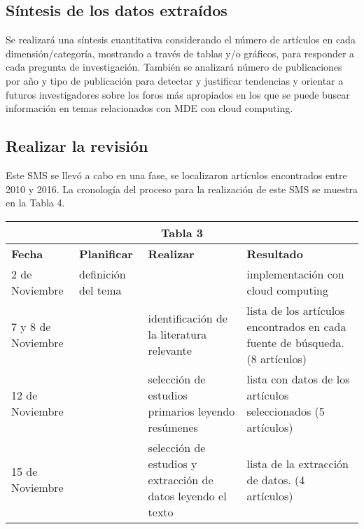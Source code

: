 \documentclass{llncs}
\begin{document}
\subsection{Síntesis de los datos extraídos}

Se realizará una síntesis cuantitativa considerando el número de artículos en cada dimensión/categoría, mostrando a través de tablas y/o gráficos, para responder a cada pregunta de investigación.
También se analizará número de publicaciones por año y tipo de publicación para detectar y justificar tendencias y orientar a futuros investigadores sobre los foros más apropiados en los que se puede buscar información en temas relacionados con MDE con cloud computing.

\subsection{Realizar la revisión}
Este SMS se llevó a cabo en una fase, se localizaron artículos encontrados entre 2010 y 2016. La cronología del proceso para la realización de este SMS se muestra en la Tabla 4. \\
\begin{tabular}{  | p{2cm} | p{3cm}  |  p{3cm} | p{3cm} |}
  \hline
  \multicolumn{4}{|c|}{\bf Tabla 3} \\
  \hline
  \bf Fecha  & \bf Planificar & \bf Realizar & \bf Resultado \\
  \hline
   2 de Noviembre  & definición del tema & & implementación con cloud computing\\
  \hline
   7 y 8 de Noviembre &  & identificación de la literatura relevante & lista de los artículos encontrados en cada fuente de búsqueda.(8 artículos)\\
   \hline
    12 de Noviembre  & & selección de estudios primarios leyendo resúmenes & lista con datos de los artículos seleccionados (5 artículos)\\
    \hline
     15 de Noviembre & & selección de estudios y extracción de datos leyendo el texto & lista de la extracción de datos. (4 artículos) \\
    \hline
 \end{tabular}
\end{document}
